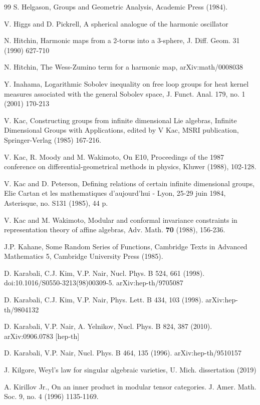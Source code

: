 \documentclass{amsart}
\theoremstyle{conjecture}
\theoremstyle{definition}
\theoremstyle{question}
\theoremstyle{questions}
\theoremstyle{remark}
\theoremstyle{remarks}
\theoremstyle{example}
\numberwithin{equation}{section}
\begin{document}
\begin{thebibliography}{99}
 S. Helgason, Groups and Geometric Analysis, Academic Press (1984).

V. Higgs and D. Pickrell, A spherical analogue of the harmonic oscillator 

 N. Hitchin, Harmonic maps from a 2-torus into a 3-sphere, J. Diff. Geom. 31 (1990) 627-710

 N. Hitchin, The Wess-Zumino term for a harmonic map, arXiv:math/0008038

 Y. Inahama, Logarithmic Sobolev inequality on free loop groups
for heat kernel measures associated with the general Sobolev space, J. Funct. Anal. 179, no. 1 (2001) 170-213


 V. Kac, Constructing groups from infinite dimensional Lie
algebras, Infinite Dimensional Groups with Applications, edited by
V Kac, MSRI publication, Springer-Verlag (1985) 167-216.

 V. Kac, R. Moody and M. Wakimoto, On E10, Proceedings of the 1987
conference on differential-geometrical methods in physics, Kluwer (1988), 102-128.

 V. Kac and D. Peterson, Defining relations of certain
infinite dimensional groups, Elie Cartan et les mathematiques d'aujourd'hui - Lyon, 25-29 juin 1984,
Asterisque, no. S131 (1985), 44 p.

V. Kac and M. Wakimoto, Modular and conformal
invariance constraints in representation theory of affine
algebras, Adv. Math. {\bf 70} (1988), 156-236.

 J.P. Kahane, Some Random Series of Functions,
Cambridge Texts in Advanced Mathematics 5, Cambridge University
Press (1985).

 D. Karabali, C.J. Kim, V.P. Nair, Nucl. Phys. B 524, 661 (1998).
doi:10.1016/S0550-3213(98)00309-5. arXiv:hep-th/9705087

 D. Karabali, C.J. Kim, V.P. Nair, Phys. Lett. B 434, 103 (1998).
arXiv:hep-th/9804132

 D. Karabali, V.P. Nair, A. Yelnikov, Nucl. Phys. B 824, 387 (2010).
arXiv:0906.0783 [hep-th]


 D. Karabali, V.P. Nair, Nucl. Phys. B 464, 135 (1996).
arXiv:hep-th/9510157


J. Kilgore, Weyl's law for singular algebraic varieties, U. Mich. dissertation (2019)

 A. Kirillov Jr., On an inner product in modular tensor categories.
J. Amer. Math. Soc. 9, no. 4 (1996) 1135-1169.


\end{thebibliography}
\end{document}
